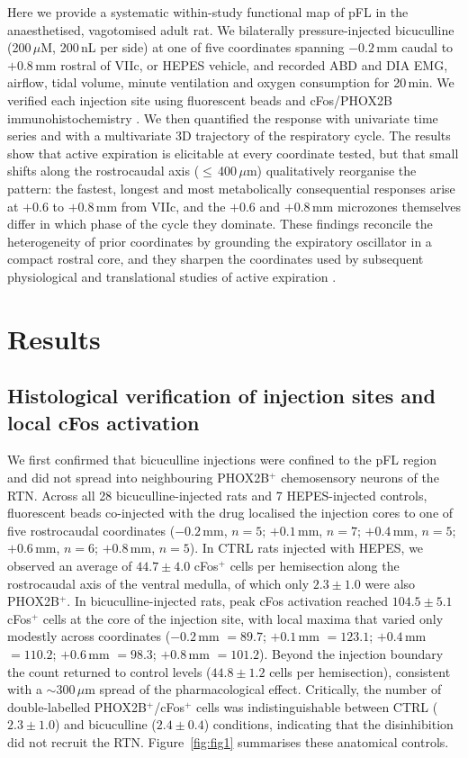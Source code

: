 \documentclass[11pt]{article}
\begin{document}
Here we provide a systematic within-study functional map of pFL in the
anaesthetised, vagotomised adult rat. We bilaterally pressure-injected
bicuculline (200\,$\mu$M, 200\,nL per side) at one of five coordinates
spanning $-0.2$\,mm caudal to $+0.8$\,mm rostral of VIIc, or HEPES
vehicle, and recorded ABD and DIA EMG, airflow, tidal volume, minute
ventilation and oxygen consumption for 20\,min. We verified each injection
site using fluorescent beads and cFos/PHOX2B immunohistochemistry
\citep{Marina2010Essential,Takakura2013Phox2b}. We then quantified the
response with univariate time series and with a multivariate 3D trajectory
of the respiratory cycle. The results show that active expiration is
elicitable at every coordinate tested, but that small shifts along the
rostrocaudal axis ($\leq$\,400\,$\mu$m) qualitatively reorganise the
pattern: the fastest, longest and most metabolically consequential
responses arise at $+0.6$ to $+0.8$\,mm from VIIc, and the $+0.6$ and
$+0.8$\,mm microzones themselves differ in which phase of the cycle they
dominate. These findings reconcile the heterogeneity of prior coordinates
by grounding the expiratory oscillator in a compact rostral core, and
they sharpen the coordinates used by subsequent physiological and
translational studies of active expiration
\citep{Pagliardini2024Parafacial,Jenkin2017Roles,Pisanski2020Parafacial,Pisanski2019Parafacial}.

\section{Results}

\subsection{Histological verification of injection sites and local cFos activation}

We first confirmed that bicuculline injections were confined to the pFL
region and did not spread into neighbouring PHOX2B$^+$ chemosensory
neurons of the RTN. Across all 28 bicuculline-injected rats and 7
HEPES-injected controls, fluorescent beads co-injected with the drug
localised the injection cores to one of five rostrocaudal coordinates
($-0.2$\,mm, $n=5$; $+0.1$\,mm, $n=7$; $+0.4$\,mm, $n=5$; $+0.6$\,mm,
$n=6$; $+0.8$\,mm, $n=5$). In CTRL rats injected with HEPES, we observed
an average of $44.7\pm4.0$ cFos$^+$ cells per hemisection along the
rostrocaudal axis of the ventral medulla, of which only $2.3\pm1.0$ were
also PHOX2B$^+$. In bicuculline-injected rats, peak cFos activation
reached $104.5\pm5.1$ cFos$^+$ cells at the core of the injection site,
with local maxima that varied only modestly across coordinates
($-0.2$\,mm $=89.7$; $+0.1$\,mm $=123.1$; $+0.4$\,mm $=110.2$; $+0.6$\,mm
$=98.3$; $+0.8$\,mm $=101.2$). Beyond the injection boundary the count
returned to control levels ($44.8\pm1.2$ cells per hemisection),
consistent with a $\sim$300\,$\mu$m spread of the pharmacological effect.
Critically, the number of double-labelled PHOX2B$^+$/cFos$^+$ cells was
indistinguishable between CTRL ($2.3\pm1.0$) and bicuculline
($2.4\pm0.4$) conditions, indicating that the disinhibition did not
recruit the RTN. Figure~\ref{fig:fig1} summarises these anatomical
controls.
\end{document}
